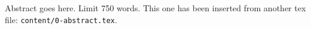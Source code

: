 Abstract goes here. Limit 750 words. This one has been inserted from another tex file: \texttt{content/0-abstract.tex}.